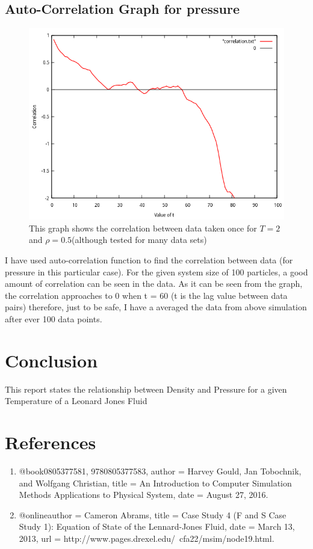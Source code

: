\documentclass[]{report}
\begin{document}
\newpage
\subsection*{Auto-Correlation Graph for pressure}
\begin{figure}[h]
	\includegraphics[scale=0.8]{Correlation graph}
	\caption{ This graph shows the correlation between data taken once for $T=2$ and $\rho=0.5$(although tested for many data sets)}
\end{figure}
I have used auto-correlation function to find the correlation between data (for pressure in this particular case). For the given system size of 100 particles, a good amount of correlation can be seen in the data. As it can be seen from the graph, the correlation approaches to 0 when t = 60 (t is the lag value between data pairs) therefore, just to be safe, I have a averaged the data from above simulation after ever 100 data points.

\newpage
\section*{Conclusion}
This report states the relationship between Density and Pressure for a given Temperature of a Leonard Jones Fluid

\section*{References}

\begin{enumerate}
	\item @book{0805377581, 9780805377583,
		author = {Harvey Gould, Jan Tobochnik, and Wolfgang Christian},
		title = {An Introduction to Computer Simulation Methods
			Applications to Physical System},
		date = {August 27, 2016}.}
	\item @online{author = {Cameron Abrams}, title = {Case Study 4 (F and S Case Study 1): Equation of State of the Lennard-Jones Fluid},
		date = {March 13, 2013},
		url = {http://www.pages.drexel.edu/~cfa22/msim/node19.html}. }
	
	
	
\end{enumerate}
\end{document}
